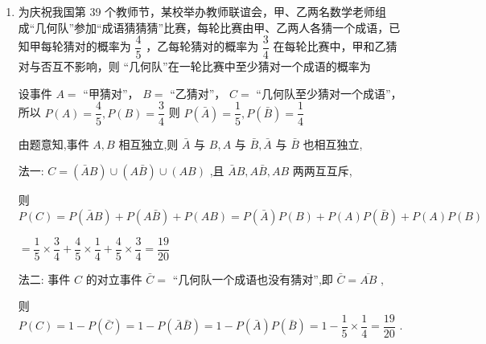 \begin{enumerate}
\begin{enumerate}
\begin{jieda}
            $P\left( {ABC}\right)  = P\left( A\right) P\left( B\right) P\left( C\right)  = \dfrac{1}{2} \times  \dfrac{2}{3} \times  \dfrac{3}{4} = \dfrac{1}{4}$
        \end{jieda}
        
        \item 为庆祝我国第 39 个教师节，某校举办教师联谊会，甲、乙两名数学老师组成“几何队”参加“成语猜猜猜”比赛，每轮比赛由甲、乙两人各猜一个成语，已知甲每轮猜对的概率为 $\dfrac{4}{5}$ ，乙每轮猜对的概率为 $\dfrac{3}{4}$ 在每轮比赛中，甲和乙猜对与否互不影响，则 “几何队”在一轮比赛中至少猜对一个成语的概率为
        \begin{jieda}
            设事件 $A =$ “甲猜对”， $B =$ “乙猜对”， $C =$ “几何队至少猜对一个成语”，所以 $P\left( A\right)  = \dfrac{4}{5},P\left( B\right)  = \dfrac{3}{4}$ 则 $P\left( \bar{A}\right)  = \dfrac{1}{5},P\left( \bar{B}\right)  = \dfrac{1}{4}$
            
            由题意知,事件 $A,B$ 相互独立,则 $\bar{A}$ 与 $B,A$ 与 $\bar{B},\bar{A}$ 与 $\bar{B}$ 也相互独立,
            
            法一: $C = \left( {\bar{A}B}\right)  \cup  \left( {A\bar{B}}\right)  \cup  \left( {AB}\right)$ ,且 $\bar{A}B,A\bar{B},{AB}$ 两两互互斥,
            
            则 $P\left( C\right)  = P\left( {\bar{A}B}\right)  + P\left( {A\bar{B}}\right)  + P\left( {AB}\right)  = P\left( \bar{A}\right) P\left( B\right)  + P\left( A\right) P\left( \bar{B}\right)  + P\left( A\right) P\left( B\right)$
            
            $= \dfrac{1}{5} \times  \dfrac{3}{4} + \dfrac{4}{5} \times  \dfrac{1}{4} + \dfrac{4}{5} \times  \dfrac{3}{4} = \dfrac{19}{20}$
            
            法二: 事件 $C$ 的对立事件 $\bar{C} =$ “几何队一个成语也没有猜对”,即 $\bar{C} = \overline{AB}$ ,
            
            则 $P\left( C\right)  = 1 - P\left( \bar{C}\right)  = 1 - P\left( {\bar{A}\bar{B}}\right)  = 1 - P\left( \bar{A}\right) P\left( \bar{B}\right)  = 1 - \dfrac{1}{5} \times  \dfrac{1}{4} = \dfrac{19}{20}$ .
        \end{jieda}
    \end{enumerate}
    

\end{enumerate}

